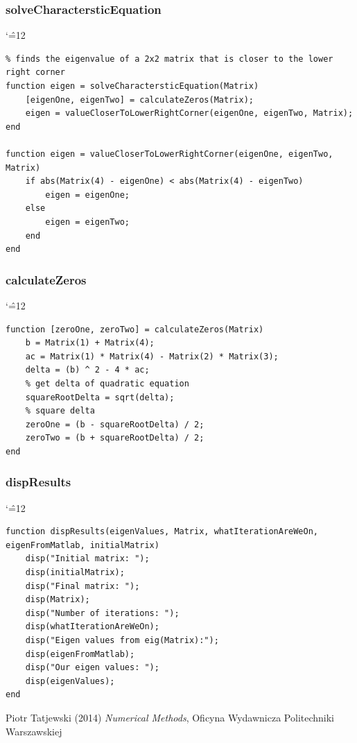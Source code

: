 \documentclass[12pt]{report}
\newenvironment{simplechar}{%
   \catcode`\^=12
}{}
\begin{document}
\subsubsection{solveCharactersticEquation}
\begin{simplechar}
\begin{lstlisting}
% finds the eigenvalue of a 2x2 matrix that is closer to the lower right corner
function eigen = solveCharactersticEquation(Matrix)
    [eigenOne, eigenTwo] = calculateZeros(Matrix);
    eigen = valueCloserToLowerRightCorner(eigenOne, eigenTwo, Matrix);
end

function eigen = valueCloserToLowerRightCorner(eigenOne, eigenTwo, Matrix)
    if abs(Matrix(4) - eigenOne) < abs(Matrix(4) - eigenTwo)
        eigen = eigenOne;
    else
        eigen = eigenTwo;
    end
end
\end{lstlisting}
\end{simplechar}

\subsubsection{calculateZeros}
\begin{simplechar}
\begin{lstlisting}
function [zeroOne, zeroTwo] = calculateZeros(Matrix)
    b = Matrix(1) + Matrix(4);
    ac = Matrix(1) * Matrix(4) - Matrix(2) * Matrix(3);
    delta = (b) ^ 2 - 4 * ac;
    % get delta of quadratic equation
    squareRootDelta = sqrt(delta);
    % square delta
    zeroOne = (b - squareRootDelta) / 2;
    zeroTwo = (b + squareRootDelta) / 2;
end
\end{lstlisting}
\end{simplechar}

\subsubsection{dispResults}
\begin{simplechar}
\begin{lstlisting}
function dispResults(eigenValues, Matrix, whatIterationAreWeOn, eigenFromMatlab, initialMatrix)
    disp("Initial matrix: ");
    disp(initialMatrix);
    disp("Final matrix: ");
    disp(Matrix);
    disp("Number of iterations: ");
    disp(whatIterationAreWeOn);
    disp("Eigen values from eig(Matrix):");
    disp(eigenFromMatlab);
    disp("Our eigen values: ");
    disp(eigenValues);
end
\end{lstlisting}
\end{simplechar}


\begin{thebibliography}{9}
Piotr Tatjewski (2014) \emph{Numerical Methods}, Oficyna Wydawnicza Politechniki Warszawskiej
\end{thebibliography}
\end{document}
